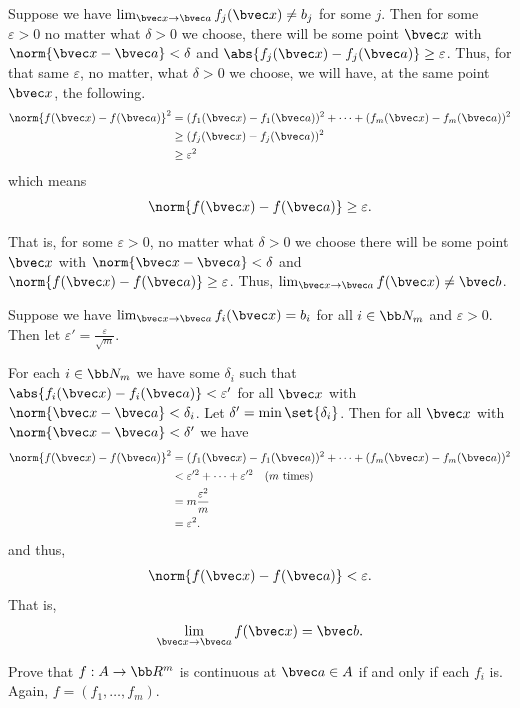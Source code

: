 \documentclass[12pt, letterpaper]{hmcpset}
\begin{document}
\begin{solution}
	Suppose we have $\lim_{\bvec x \to \bvec a} f_j(\bvec x) \neq b_j$ for some $j$. Then for some $\varepsilon > 0$ no matter what $\delta > 0$ we choose, there will be some point $\bvec x$ with $\norm{\bvec x - \bvec a} < \delta$ and ${\abs{f_j(\bvec x) - f_j(\bvec a)} \ge \varepsilon}$. Thus, for that same $\varepsilon$, no matter, what $\delta > 0$ we choose, we will have, at the same point $\bvec x$, the following.
	\[
		\begin{split}
			\norm{f(\bvec x) - f(\bvec a)}^2 & = (f_1(\bvec x) - f_1(\bvec a))^2 + \cdots + (f_m(\bvec x) - f_m(\bvec a))^2 \\
							 & \ge (f_j(\bvec x) - f_j(\bvec a))^2 \\
							 & \ge \varepsilon^2
		\end{split}
	\]
	which means
	\[
		\norm{f(\bvec x) - f(\bvec a)} \ge \varepsilon.
	\]

	That is, for some $\varepsilon > 0$, no matter what $\delta > 0$ we choose there will be some point $\bvec x$ with $\norm{\bvec x - \bvec a} < \delta$ and $\norm{f(\bvec x) - f(\bvec a)} \ge \varepsilon$. Thus, $\lim_{\bvec x \to \bvec a} f(\bvec x) \neq \bvec b$.

	Suppose we have $\lim_{\bvec x \to \bvec a} f_i(\bvec x) = b_i$ for all $i \in \bb N_m$ and $\varepsilon > 0$. Then let $\varepsilon' = \frac{\varepsilon}{\sqrt m}$.

	For each $i \in \bb N_m$ we have some $\delta_i$ such that $\abs{f_i(\bvec x) - f_i(\bvec a)} < \varepsilon'$ for all $\bvec x$ with $\norm{\bvec x - \bvec a} < \delta_i$. Let $ \delta' = \min \set{\delta_i}$. Then for all $\bvec x$ with $\norm{\bvec x - \bvec a} < \delta'$ we have
	\[
		\begin{split}
			\norm{f(\bvec x) - f(\bvec a)}^2 & = (f_1(\bvec x) - f_1(\bvec a))^2 + \cdots + (f_m(\bvec x) - f_m(\bvec a))^2 \\
						       & < \varepsilon'^2 + \cdots + \varepsilon'^2 \quad \text{($m$ times)} \\
						       & = m \frac{\varepsilon^2}{m} \\
						       & = \varepsilon^2.
		\end{split}
	\]
	and thus,
	\[
		\norm{f(\bvec x) - f(\bvec a)} < \varepsilon.
	\]
	That is,
	\[
		\lim_{\bvec x \to \bvec a} f(\bvec x) = \bvec b.
	\]
\end{solution}

\pagebreak

\begin{problem}[24]
	Prove that $f : A \to \bb R^m$ is continuous at $\bvec a \in A$ if and only if each $f_i$ is. Again, $f = (f_1, \ldots, f_m)$.
\end{problem}
\end{document}
